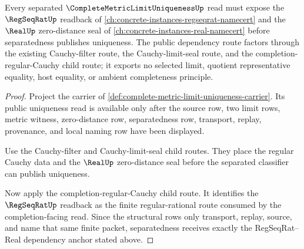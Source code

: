 \begin{theorem}
\label{thm:complete-metric-limit-uniqueness-regseqrat-real-dependency-anchor}
Every separated $\CompleteMetricLimitUniquenessUp$ read must expose the $\RegSeqRatUp$ readback of \autoref{ch:concrete-instances-regseqrat-namecert} and the $\RealUp$ zero-distance seal of \autoref{ch:concrete-instances-real-namecert} before separatedness publishes uniqueness. The public dependency route factors through the existing Cauchy-filter route, the Cauchy-limit-seal route, and the completion-regular-Cauchy child route; it exports no selected limit, quotient representative equality, host equality, or ambient completeness principle.
\end{theorem}
\begin{proof}
Project the carrier of \autoref{def:complete-metric-limit-uniqueness-carrier}. Its public uniqueness read is available only after the source row, two limit rows, metric witness, zero-distance row, separatedness row, transport, replay, provenance, and local naming row have been displayed.

Use the Cauchy-filter and Cauchy-limit-seal child routes. They place the regular Cauchy data and the $\RealUp$ zero-distance seal before the separated classifier can publish uniqueness.

Now apply the completion-regular-Cauchy child route. It identifies the $\RegSeqRatUp$ readback as the finite regular-rational route consumed by the completion-facing read. Since the structural rows only transport, replay, source, and name that same finite packet, separatedness receives exactly the RegSeqRat--Real dependency anchor stated above.
\end{proof}
